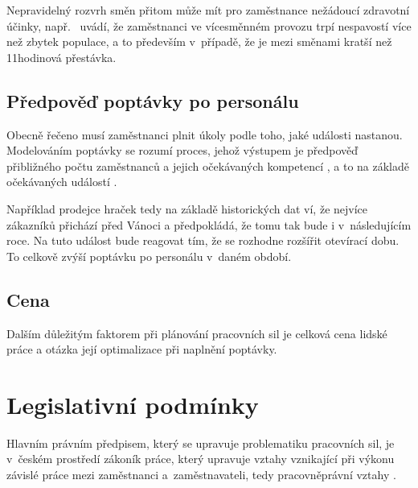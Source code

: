 \documentclass[twoside]{ctuthesis}
\begin{document}
Nepravidelný rozvrh směn přitom může mít pro zaměstnance nežádoucí zdravotní účinky, např.~\cite{flo2013shift} uvádí, že zaměstnanci ve vícesměnném provozu trpí nespavostí více než zbytek populace, a to především v~případě, že je mezi směnami kratší než 11hodinová přestávka.




\subsection{Předpověď poptávky po personálu}
\label{sub:demand}
Obecně řečeno musí zaměstnanci plnit úkoly podle toho, jaké události nastanou. Modelováním poptávky se rozumí proces, jehož výstupem je předpověď přibližného počtu zaměstnanců a jejich očekávaných kompetencí \cite[s.~219]{armstrong2014}, a to na základě očekávaných událostí \cite{ernst2004staff}.

Například prodejce hraček tedy na základě historických dat ví, že nejvíce zákazníků přichází před Vánoci a předpokládá, že tomu tak bude i v~následujícím roce. Na tuto událost bude reagovat tím, že se rozhodne rozšířit otevírací dobu. To celkově zvýší poptávku po personálu v~daném období.

\subsection{Cena}
Dalším důležitým faktorem při plánování pracovních sil je celková cena lidské práce a otázka její optimalizace při naplnění poptávky.


\section{Legislativní podmínky}
\label{section:legislativa}
Hlavním právním předpisem, který se upravuje problematiku pracovních sil, je v~českém prostředí zákoník práce, který upravuje vztahy vznikající při výkonu závislé práce mezi zaměstnanci a~zaměstnavateli, tedy pracovněprávní vztahy \cite{zakonik06-262}.
\end{document}
